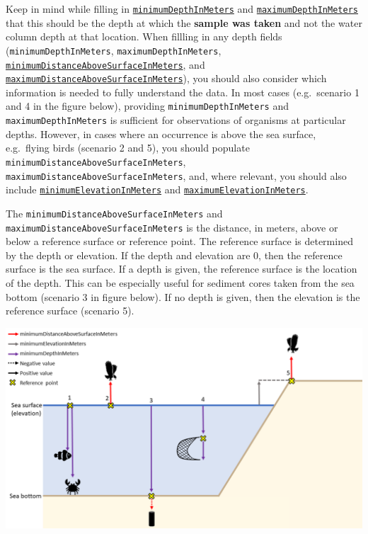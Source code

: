 \documentclass[
  letterpaper,
  DIV=11,
  numbers=noendperiod,
  oneside]{scrreprt}
\begin{document}
Keep in mind while filling in
\href{http://rs.tdwg.org/dwc/terms/maximumDepthInMeters}{\texttt{minimumDepthInMeters}}
and
\href{http://rs.tdwg.org/dwc/terms/minimumDepthInMeters}{\texttt{maximumDepthInMeters}}
that this should be the depth at which the \textbf{sample was taken} and
not the water column depth at that location. When fillling in any depth
fields (\texttt{minimumDepthInMeters}, \texttt{maximumDepthInMeters},
\href{http://rs.tdwg.org/dwc/terms/minimumDistanceAboveSurfaceInMeters}{\texttt{minimumDistanceAboveSurfaceInMeters}},
and
\href{http://rs.tdwg.org/dwc/terms/maximumDistanceAboveSurfaceInMeters}{\texttt{maximumDistanceAboveSurfaceInMeters}}),
you should also consider which information is needed to fully understand
the data. In most cases (e.g.~scenario 1 and 4 in the figure below),
providing \texttt{minimumDepthInMeters} and
\texttt{maximumDepthInMeters} is sufficient for observations of
organisms at particular depths. However, in cases where an occurrence is
above the sea surface, e.g.~flying birds (scenario 2 and 5), you should
populate \texttt{minimumDistanceAboveSurfaceInMeters},
\texttt{maximumDistanceAboveSurfaceInMeters}, and, where relevant, you
should also include
\href{https://dwc.tdwg.org/list/\#dwc_minimumElevationInMeters}{\texttt{minimumElevationInMeters}}
and
\href{https://dwc.tdwg.org/list/\#dwc_maximumElevationInMeters}{\texttt{maximumElevationInMeters}}.

The \texttt{minimumDistanceAboveSurfaceInMeters} and
\texttt{maximumDistanceAboveSurfaceInMeters} is the distance, in meters,
above or below a reference surface or reference point. The reference
surface is determined by the depth or elevation. If the depth and
elevation are 0, then the reference surface is the sea surface. If a
depth is given, the reference surface is the location of the depth. This
can be especially useful for sediment cores taken from the sea bottom
(scenario 3 in figure below). If no depth is given, then the elevation
is the reference surface (scenario 5).

\includegraphics{images/Depth-figure-updated.png}
\end{document}
